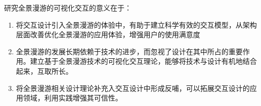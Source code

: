 研究全景漫游的可视化交互的意义在于：
\begin{enumerate}
	\item 将交互设计引入全景漫游的体验中，有助于建立科学有效的交互模型，从架构层面改善优化全景漫游的应用体验，增强用户的使用满意度
	\item 全景漫游的发展长期依赖于技术的进步，而忽视了设计在其中所占的重要作用。建立基于全景漫游技术的可视化交互理论，能够将技术与设计有机地结合起来，互取所长。
	\item 将全景漫游相关设计理论补充入交互设计中形成反哺，可以拓展交互设计的应用领域，利用实践增强其可信性。
\end{enumerate}


